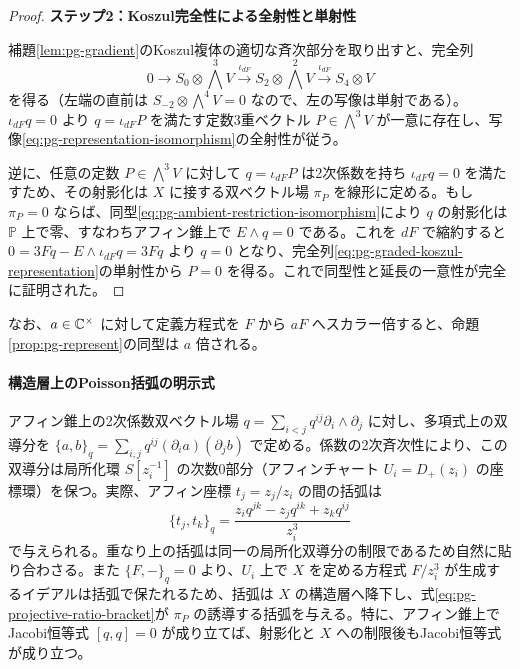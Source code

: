 \begin{proof}
\par\medskip\noindent\textbf{ステップ2：Koszul完全性による全射性と単射性}\par\nobreak\smallskip
補題\ref{lem:pg-gradient}のKoszul複体の適切な斉次部分を取り出すと、完全列
\begin{equation}\label{eq:pg-graded-koszul-representation}
0\longrightarrow S_0\otimes\bigwedge^3V
\xrightarrow{\iota_{dF}}S_2\otimes\bigwedge^2V
\xrightarrow{\iota_{dF}}S_4\otimes V
\end{equation}
を得る（左端の直前は $S_{-2}\otimes\bigwedge^4V=0$ なので、左の写像は単射である）。$\iota_{dF}q=0$ より $q=\iota_{dF}P$ を満たす定数3重ベクトル $P\in\bigwedge^3V$ が一意に存在し、写像\eqref{eq:pg-representation-isomorphism}の全射性が従う。

逆に、任意の定数 $P\in\bigwedge^3V$ に対して $q=\iota_{dF}P$ は2次係数を持ち $\iota_{dF}q=0$ を満たすため、その射影化は $X$ に接する双ベクトル場 $\pi_P$ を線形に定める。もし $\pi_P=0$ ならば、同型\eqref{eq:pg-ambient-restriction-isomorphism}により $q$ の射影化は $\mathbb P$ 上で零、すなわちアフィン錐上で $E\wedge q=0$ である。これを $dF$ で縮約すると $0=3Fq-E\wedge\iota_{dF}q=3Fq$ より $q=0$ となり、完全列\eqref{eq:pg-graded-koszul-representation}の単射性から $P=0$ を得る。これで同型性と延長の一意性が完全に証明された。
\end{proof}

なお、$a\in\mathbb C^\times$ に対して定義方程式を $F$ から $aF$ へスカラー倍すると、命題\ref{prop:pg-represent}の同型は $a$ 倍される。

\paragraph{構造層上のPoisson括弧の明示式}
アフィン錐上の2次係数双ベクトル場 $q=\sum_{i<j}q^{ij}\partial_i\wedge\partial_j$ に対し、多項式上の双導分を $\{a,b\}_q=\sum_{i,j}q^{ij}(\partial_i a)(\partial_j b)$ で定める。係数の2次斉次性により、この双導分は局所化環 $S[z_i^{-1}]$ の次数0部分（アフィンチャート $U_i=D_+(z_i)$ の座標環）を保つ。実際、アフィン座標 $t_j=z_j/z_i$ の間の括弧は
\begin{equation}\label{eq:pg-projective-ratio-bracket}
\{t_j,t_k\}_q
=\frac{z_iq^{jk}-z_jq^{ik}+z_kq^{ij}}{z_i^3}
\end{equation}
で与えられる。重なり上の括弧は同一の局所化双導分の制限であるため自然に貼り合わさる。また $\{F,-\}_q=0$ より、$U_i$ 上で $X$ を定める方程式 $F/z_i^3$ が生成するイデアルは括弧で保たれるため、括弧は $X$ の構造層へ降下し、式\eqref{eq:pg-projective-ratio-bracket}が $\pi_P$ の誘導する括弧を与える。特に、アフィン錐上でJacobi恒等式 $[q,q]=0$ が成り立てば、射影化と $X$ への制限後もJacobi恒等式が成り立つ。


